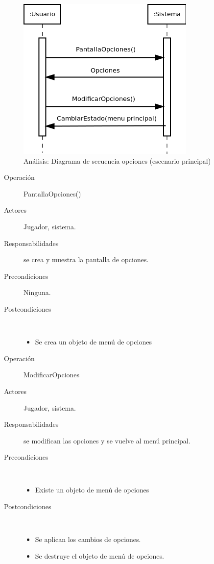 \begin{figure}[H] 
  \label{secuencia_opciones}
  \begin{center}
    \includegraphics[scale=0.6]{imagenes/analisis/secuencia_opciones.png}
  \end{center}
  \caption{Análisis: Diagrama de secuencia opciones (escenario principal)}
\end{figure}

\begin{description}
    \item [Operación] PantallaOpciones()
    \item [Actores] Jugador, sistema.
    \item [Responsabilidades] se crea y muestra la pantalla de opciones.
    \item [Precondiciones] Ninguna.
    \item [Postcondiciones] $\quad$
        \begin{itemize}
            \item Se crea un objeto de menú de opciones
        \end{itemize}
\end{description}

\begin{description}
    \item [Operación] ModificarOpciones
    \item [Actores] Jugador, sistema.
    \item [Responsabilidades] se modifican las opciones y se vuelve al menú principal.
    \item [Precondiciones] $\quad$
        \begin{itemize}
            \item Existe un objeto de menú de opciones
        \end{itemize}
    \item [Postcondiciones] $\quad$
        \begin{itemize}
            \item Se aplican los cambios de opciones.
            \item Se destruye el objeto de menú de opciones.
        \end{itemize}
\end{description}

